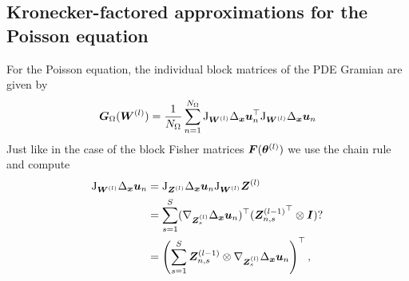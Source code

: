 \subsection{Kronecker-factored approximations for the Poisson equation}
For the Poisson equation, the individual block matrices of the PDE Gramian are given by 
\begin{align}
    {\bm{G}}_\Omega({\bm{W}}^{(l)}) = \frac1{{N_\Omega}} \sum_{n=1}^{N_\Omega} \mathrm{J}_{{\bm{W}}^{(l)}} \Delta_{\bm{x}} {\bm{u}}_n^\top \mathrm{J}_{{\bm{W}}^{(l)}} \Delta_{\bm{x}} {\bm{u}}_n
\end{align}
Just like in the case of the block Fisher matrices ${\bm{F}}({\bm{\theta}}^{(l)})$ we use the chain rule and compute 
\begin{align*}
    \jac_{\mW^{(l)}} \Delta_\vx \vu_n & = \jac_{\mZ^{(l)}}\Delta_\vx \vu_n \jac_{\mW^{(l)}} \mZ^{(l)} %
    \\ & = \sum_{s=1}^S (\nabla_{\mZ^{(l)}_s} \Delta_{\vx}\vu_n)^\top  ({\mZ^{(l-1)}_{n,s}}^\top \otimes \mI)? 
    \\ & = \left(\sum_{s=1}^S \mZ^{(l-1)}_{n,s} \otimes \nabla_{\mZ^{(l)}_s} \Delta_{\vx}\vu_n\right)^\top,
\end{align*}
